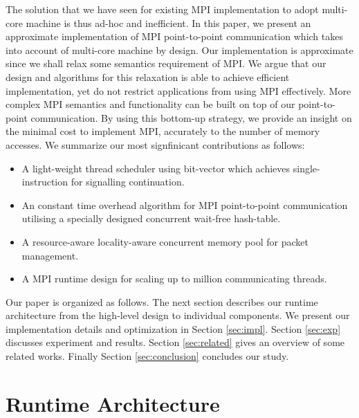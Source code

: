 \documentclass{sig-alternate-05-2015}
\begin{document}
The solution that we have seen for existing MPI implementation to adopt
multi-core machine is thus ad-hoc and inefficient. In this paper, we present an
approximate implementation of MPI point-to-point communication which takes into
account of multi-core machine by design. Our implementation is approximate
since we shall relax some semantics requirement of MPI. We argue that our
design and algorithms for this relaxation is able to achieve efficient
implementation, yet do not restrict applications from using MPI effectively.
More complex MPI semantics and functionality can be built on top of our
point-to-point communication. By using this bottom-up strategy, we provide an
insight on the minimal cost to implement MPI, accurately to the number of
memory accesses. We summarize our most signfinicant contributions as follows:
\begin{itemize}
  \item A light-weight thread scheduler using bit-vector which achieves
single-instruction for signalling continuation. 
  \item An constant time overhead algorithm for MPI point-to-point communication
utilising a specially designed concurrent wait-free hash-table.
  \item A resource-aware locality-aware concurrent memory pool for packet management.
  \item A MPI runtime design for scaling up to million communicating threads.
\end{itemize}

Our paper is organized as follows. The next section describes our runtime
architecture from the high-level design to individual components. We present
our implementation details and optimization in Section \ref{sec:impl}. Section
\ref{sec:exp} discusses experiment and results. Section \ref{sec:related} gives
an overview of some related works. Finally Section \ref{sec:conclusion} concludes
our study.

\section{Runtime Architecture}
\label{sec:runtime}
\end{document}
